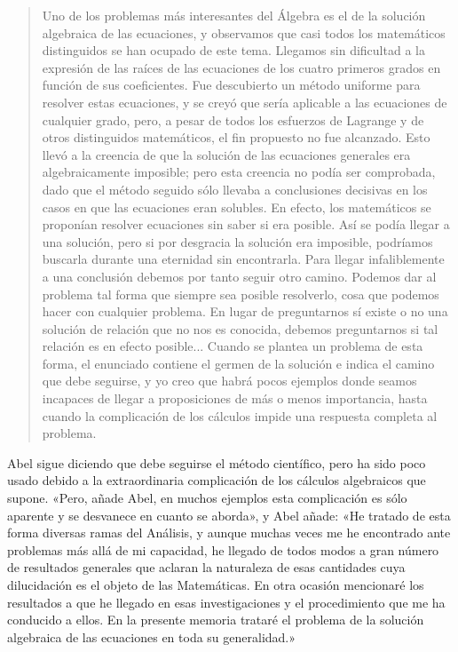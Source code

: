 \documentclass[a4paper, 12pt, draft]{article}
\begin{document}
\begin{quote}\small

Uno de los problemas más interesantes del Álgebra es el de la solución algebraica de las ecuaciones, y observamos que casi todos los matemáticos distinguidos se han ocupado de este tema. Llegamos sin dificultad a la expresión de las raíces de las ecuaciones de los cuatro primeros grados en función de sus coeficientes. Fue descubierto un método uniforme para resolver estas ecuaciones, y se creyó que sería aplicable a las ecuaciones de cualquier grado, pero, a pesar de todos los esfuerzos de Lagrange y de otros distinguidos matemáticos, el fin propuesto no fue alcanzado. Esto llevó a la creencia de que la solución de las ecuaciones generales era algebraicamente imposible; pero esta creencia no podía ser comprobada, dado que el método seguido sólo llevaba a conclusiones decisivas en los casos en que las ecuaciones eran solubles. En efecto, los matemáticos se proponían resolver ecuaciones sin saber si era posible. Así se podía llegar a una solución, pero si por desgracia la solución era imposible, podríamos buscarla durante una eternidad sin encontrarla. Para llegar infaliblemente a una conclusión debemos por tanto seguir otro camino. Podemos dar al problema tal forma que siempre sea posible resolverlo, cosa que podemos hacer con cualquier problema. En lugar de preguntarnos sí existe o no una solución de relación que no nos es conocida, debemos preguntarnos si tal relación es en efecto posible...  Cuando se plantea un problema de esta forma, el enunciado contiene el germen de la solución e indica el camino que debe seguirse, y yo creo que habrá pocos ejemplos donde seamos incapaces de llegar a proposiciones de más o menos importancia, hasta cuando la complicación de los cálculos impide una respuesta completa al problema.

\end{quote}

Abel sigue diciendo que debe seguirse el método científico, pero ha sido poco usado debido a la extraordinaria complicación de los cálculos algebraicos que supone. «Pero, añade Abel, en muchos ejemplos esta complicación es sólo aparente y se desvanece en cuanto se aborda», y Abel añade: «He tratado de esta forma diversas ramas del Análisis, y aunque muchas veces me he encontrado ante problemas más allá de mi capacidad, he llegado de todos modos a gran número de resultados generales que aclaran la naturaleza de esas cantidades cuya dilucidación es el objeto de las Matemáticas. En otra ocasión mencionaré los resultados a que he llegado en esas investigaciones y el procedimiento que me ha conducido a ellos. En la presente memoria trataré el problema de la solución algebraica de las ecuaciones en toda su generalidad.»
\end{document}
